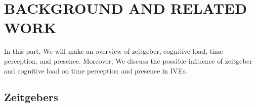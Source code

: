\documentclass[sigconf]{acmart}
\begin{document}

\section{BACKGROUND AND RELATED WORK}\label{chap:backgound}



In this part, We will make an overview of zeitgeber, cognitive load, time perception, and presence. Moreover, We discuss the possible influence of zeitgeber and cognitive load on time perception and presence in IVEs. %

\subsection{Zeitgebers}


\end{document}

